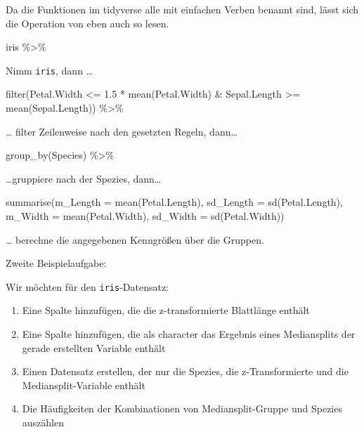\documentclass[
]{book}
\newenvironment{Shaded}{\begin{snugshade}}{\end{snugshade}}
\newcommand{\AttributeTok}[1]{\textcolor[rgb]{0.77,0.63,0.00}{#1}}
\newcommand{\FloatTok}[1]{\textcolor[rgb]{0.00,0.00,0.81}{#1}}
\newcommand{\FunctionTok}[1]{\textcolor[rgb]{0.00,0.00,0.00}{#1}}
\newcommand{\NormalTok}[1]{#1}
\newcommand{\SpecialCharTok}[1]{\textcolor[rgb]{0.00,0.00,0.00}{#1}}
\begin{document}
Da die Funktionen im tidyverse alle mit einfachen Verben benannt sind, lässt sich die Operation von eben auch so lesen.

\begin{Shaded}
\begin{Highlighting}[]
\NormalTok{iris }\SpecialCharTok{\%\textgreater{}\%} 
\end{Highlighting}
\end{Shaded}

Nimm \texttt{iris}, dann \ldots{}

\begin{Shaded}
\begin{Highlighting}[]
  \FunctionTok{filter}\NormalTok{(Petal.Width }\SpecialCharTok{\textless{}=} \FloatTok{1.5} \SpecialCharTok{*} \FunctionTok{mean}\NormalTok{(Petal.Width) }\SpecialCharTok{\&}
\NormalTok{           Sepal.Length }\SpecialCharTok{\textgreater{}=} \FunctionTok{mean}\NormalTok{(Sepal.Length)) }\SpecialCharTok{\%\textgreater{}\%} 
\end{Highlighting}
\end{Shaded}

\ldots{} filter Zeilenweise nach den gesetzten Regeln, dann\ldots{}

\begin{Shaded}
\begin{Highlighting}[]
  \FunctionTok{group\_by}\NormalTok{(Species) }\SpecialCharTok{\%\textgreater{}\%} 
\end{Highlighting}
\end{Shaded}

\ldots gruppiere nach der Spezies, dann\ldots{}

\begin{Shaded}
\begin{Highlighting}[]
  \FunctionTok{summarise}\NormalTok{(}\AttributeTok{m\_Length =} \FunctionTok{mean}\NormalTok{(Petal.Length),}
            \AttributeTok{sd\_Length =} \FunctionTok{sd}\NormalTok{(Petal.Length),}
            \AttributeTok{m\_Width =} \FunctionTok{mean}\NormalTok{(Petal.Width), }
            \AttributeTok{sd\_Width =} \FunctionTok{sd}\NormalTok{(Petal.Width))}
\end{Highlighting}
\end{Shaded}

\ldots{} berechne die angegebenen Kenngrößen über die Gruppen.

Zweite Beispielaufgabe:

Wir möchten für den \texttt{iris}-Datensatz:

\begin{enumerate}
\def\labelenumi{\arabic{enumi}.}
\item
  Eine Spalte hinzufügen, die die z-transformierte Blattlänge enthält
\item
  Eine Spalte hinzufügen, die als character das Ergebnis eines Mediansplits der gerade erstellten Variable enthält
\item
  Einen Datensatz erstellen, der nur die Spezies, die z-Transformierte und die Mediansplit-Variable enthält
\item
  Die Häufigkeiten der Kombinationen von Mediansplit-Gruppe und Spezies auszählen
\end{enumerate}
\end{document}
